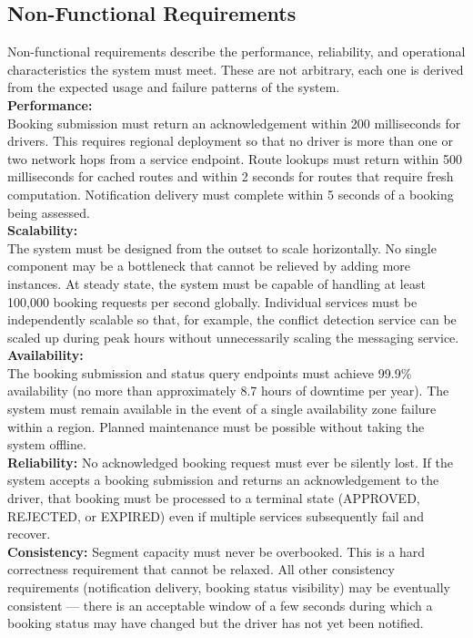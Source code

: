 \documentclass{article}
\begin{document}
\subsection{Non-Functional Requirements}
Non-functional requirements describe the performance, reliability, and operational characteristics the system must meet. These are not arbitrary, each one is derived from the expected usage and failure patterns of the system.\\
\textbf{Performance:}\\ Booking submission must return an acknowledgement within 200 milliseconds for drivers. This requires regional deployment so that no driver is more than one or two network hops from a service endpoint. Route lookups must return within 500 milliseconds for cached routes and within 2 seconds for routes that require fresh computation. Notification delivery must complete within 5 seconds of a booking being assessed.\\

\textbf{Scalability:}\\
The system must be designed from the outset to scale horizontally. No single component may be a bottleneck that cannot be relieved by adding more instances. At steady state, the system must be capable of handling at least 100,000 booking requests per second globally. Individual services must be independently scalable so that, for example, the conflict detection service can be scaled up during peak hours without unnecessarily scaling the messaging service. \\

\textbf{Availability:}\\ The booking submission and status query endpoints must achieve 99.9\% availability (no more than approximately 8.7 hours of downtime per year). The system must remain available in the event of a single availability zone failure within a region. Planned maintenance must be possible without taking the system offline. \\

\textbf{Reliability:} No acknowledged booking request must ever be silently lost. If the system accepts a booking submission and returns an acknowledgement to the driver, that booking must be processed to a terminal state (APPROVED, REJECTED, or EXPIRED) even if multiple services subsequently fail and recover.\\

\textbf{Consistency:} Segment capacity must never be overbooked. This is a hard correctness requirement that cannot be relaxed. All other consistency requirements (notification delivery, booking status visibility) may be eventually consistent — there is an acceptable window of a few seconds during which a booking status may have changed but the driver has not yet been notified.\\
\end{document}
